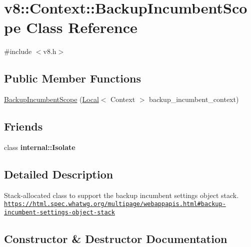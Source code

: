 \hypertarget{classv8_1_1Context_1_1BackupIncumbentScope}{}\section{v8\+:\+:Context\+:\+:Backup\+Incumbent\+Scope Class Reference}
\label{classv8_1_1Context_1_1BackupIncumbentScope}


{\ttfamily \#include $<$v8.\+h$>$}

\subsection*{Public Member Functions}
\begin{DoxyCompactItemize}
\item 
\mbox{\hyperlink{classv8_1_1Context_1_1BackupIncumbentScope_a0e5f36411216cdff0150156281b52d00}{Backup\+Incumbent\+Scope}} (\mbox{\hyperlink{classv8_1_1Local}{Local}}$<$ Context $>$ backup\+\_\+incumbent\+\_\+context)
\end{DoxyCompactItemize}
\subsection*{Friends}
\begin{DoxyCompactItemize}
\item 
\mbox{\label{classv8_1_1Context_1_1BackupIncumbentScope_a438c8b784134d31d7a50bc60098d8ba1}} 
class {\bfseries internal\+::\+Isolate}
\end{DoxyCompactItemize}


\subsection{Detailed Description}
Stack-\/allocated class to support the backup incumbent settings object stack. \href{https://html.spec.whatwg.org/multipage/webappapis.html#backup-incumbent-settings-object-stack}{\tt https\+://html.\+spec.\+whatwg.\+org/multipage/webappapis.\+html\#backup-\/incumbent-\/settings-\/object-\/stack} 

\subsection{Constructor \& Destructor Documentation}
\mbox{\label{classv8_1_1Context_1_1BackupIncumbentScope_a0e5f36411216cdff0150156281b52d00}} 

